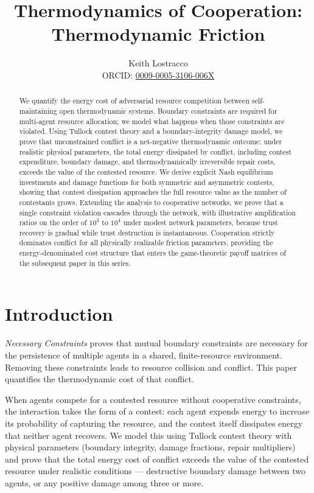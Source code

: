 \documentclass[11pt]{article}
\title{Thermodynamics of Cooperation: Thermodynamic Friction}
\author{%
Keith Lostracco%
\\[0.25em]{\normalsize ORCID: \href{https://orcid.org/0009-0005-3106-006X}{0009-0005-3106-006X}}%
}
\date{}
\theoremstyle{plain}
\theoremstyle{definition}
\theoremstyle{remark}
\let\origsection\section
\renewcommand{\section}{\needspace{12\baselineskip}\origsection}
\begin{document}
\maketitle

\begin{abstract}
We quantify the energy cost of adversarial resource competition between
self-maintaining open thermodynamic systems. Boundary constraints are
required for multi-agent resource allocation; we model what happens when
those constraints are violated. Using Tullock contest theory and a
boundary-integrity damage model, we prove that unconstrained conflict is
a net-negative thermodynamic outcome: under realistic physical
parameters, the total energy dissipated by conflict, including contest
expenditure, boundary damage, and thermodynamically irreversible repair
costs, exceeds the value of the contested resource. We derive explicit
Nash equilibrium investments and damage functions for both symmetric and
asymmetric contests, showing that contest dissipation approaches the
full resource value as the number of contestants grows. Extending the
analysis to cooperative networks, we prove that a single constraint
violation cascades through the network, with illustrative amplification
ratios on the order of \(10^3\) to \(10^4\) under modest network
parameters, because trust recovery is gradual while trust destruction is
instantaneous. Cooperation strictly dominates conflict for all
physically realizable friction parameters, providing the
energy-denominated cost structure that enters the game-theoretic payoff
matrices of the subsequent paper in this series.
\end{abstract}
\section{Introduction}\label{introduction}

\emph{Necessary Constraints} \citep{TC-I} proves that mutual boundary
constraints are necessary for the persistence of multiple agents in a
shared, finite-resource environment. Removing these constraints leads to
resource collision and conflict. This paper quantifies the thermodynamic
cost of that conflict.

When agents compete for a contested resource without cooperative
constraints, the interaction takes the form of a contest: each agent
expends energy to increase its probability of capturing the resource,
and the contest itself dissipates energy that neither agent recovers. We
model this using Tullock contest theory \citep{Tullock1980} with
physical parameters (boundary integrity, damage fractions, repair
multipliers) and prove that the total energy cost of conflict exceeds
the value of the contested resource under realistic conditions ---
destructive boundary damage between two agents, or any positive damage
among three or more.
\end{document}
